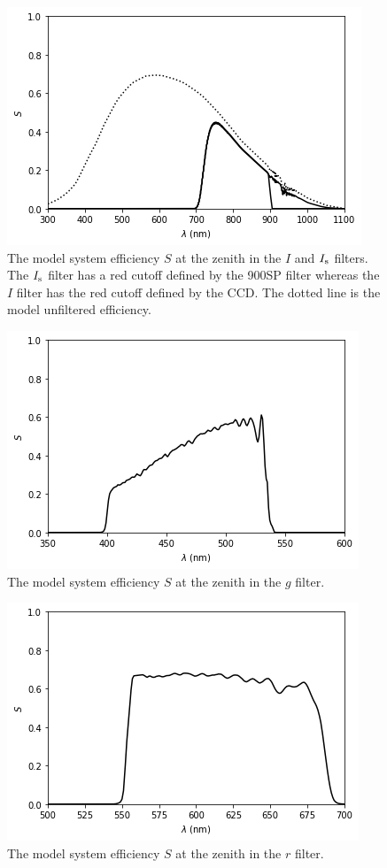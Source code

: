 \begin{figure}
\begin{center}
\includegraphics[width=0.7\linewidth]{figures/huitzi-S-JC-IIs.png}
\medskip
\caption{The model system efficiency $S$ at the zenith in the $I$ and $\mbox{$I_\mathrm{s}$}$ filters. The $\mbox{$I_\mathrm{s}$}$ filter has a red cutoff defined by the 900SP filter whereas the $I$ filter has the red cutoff defined by the CCD. The dotted line is the model unfiltered efficiency.}
\label{figure:huitzi-S-JC-IIs}
\end{center}
\end{figure}

\begin{figure}
\begin{center}
\includegraphics[width=0.7\linewidth]{figures/huitzi-S-g.png}
\medskip
\caption{The model system efficiency $S$ at the zenith in the $g$ filter.}
\end{center}
\end{figure}

\begin{figure}
\begin{center}
\includegraphics[width=0.7\linewidth]{figures/huitzi-S-r.png}
\medskip
\caption{The model system efficiency $S$ at the zenith in the $r$ filter.}
\end{center}
\end{figure}

